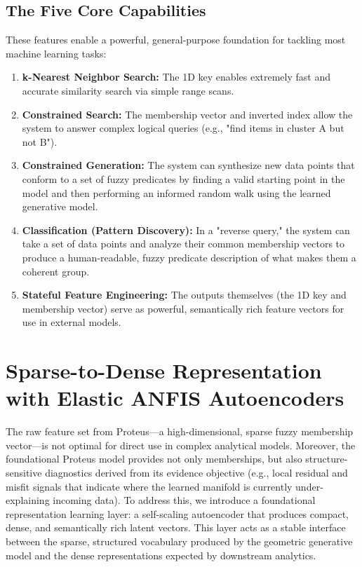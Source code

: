 \documentclass{article}
\begin{document}
\subsection{The Five Core Capabilities}
These features enable a powerful, general-purpose foundation for tackling most machine learning tasks:
\begin{enumerate}
    \item \textbf{k-Nearest Neighbor Search:} The 1D key enables extremely fast and accurate similarity search via simple range scans.
    \item \textbf{Constrained Search:} The membership vector and inverted index allow the system to answer complex logical queries (e.g., "find items in cluster A but not B").
    \item \textbf{Constrained Generation:} The system can synthesize new data points that conform to a set of fuzzy predicates by finding a valid starting point in the model and then performing an informed random walk using the learned generative model.
    \item \textbf{Classification (Pattern Discovery):} In a "reverse query," the system can take a set of data points and analyze their common membership vectors to produce a human-readable, fuzzy predicate description of what makes them a coherent group.
    \item \textbf{Stateful Feature Engineering:} The outputs themselves (the 1D key and membership vector) serve as powerful, semantically rich feature vectors for use in external models.
\end{enumerate}

\section{Sparse-to-Dense Representation with Elastic ANFIS Autoencoders}

The raw feature set from Proteus---a high-dimensional, sparse fuzzy membership vector---is not optimal for direct use in complex analytical models. Moreover, the foundational Proteus model provides not only memberships, but also structure-sensitive diagnostics derived from its evidence objective (e.g., local residual and misfit signals that indicate where the learned manifold is currently under-explaining incoming data). To address this, we introduce a foundational representation learning layer: a self-scaling autoencoder that produces compact, dense, and semantically rich latent vectors. This layer acts as a stable interface between the sparse, structured vocabulary produced by the geometric generative model and the dense representations expected by downstream analytics.
\end{document}
